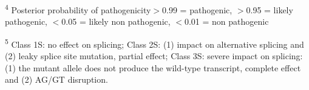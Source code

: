 \documentclass{report}\usepackage[]{graphicx}\usepackage[]{color}
\begin{document}
{\begin{minipage}[t]{0.9\columnwidth}
\textsf{\tiny{\textsuperscript{{\tiny{4}}}}}
\textsf{\scriptsize{Posterior probability of pathogenicity$>$0.99 = pathogenic, $>$0.95 = likely pathogenic, $<$0.05 = likely non pathogenic, $<$0.01 = non pathogenic }}
{\scriptsize \par}

\textsf{\tiny{\textsuperscript{{\tiny{5}}}}}
\textsf{\scriptsize{Class 1S: no effect on splicing; Class 2S: (1) impact on alternative splicing and (2) leaky splice site mutation, partial effect; Class 3S: severe impact on splicing: (1) the mutant allele does not produce the wild-type transcript, complete effect and (2) AG/GT disruption.}}%
{\scriptsize \par}
\end{minipage}}
\end{document}
